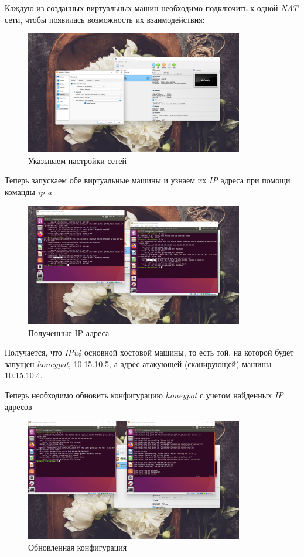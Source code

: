 \documentclass[a4paper]{article}
\begin{document}
  Каждую из созданных виртуальных машин необходимо подключить к одной \textit{NAT}
  сети, чтобы появилась возможность их взаимодействия:

  \begin{figure}[H]
    \centering
    \includegraphics[width=0.85\textwidth]{01_00 (20)}
    \caption{Указываем настройки сетей}
  \end{figure}

  Теперь запускаем обе виртуальные машины и узнаем их \textit{IP} адреса
  при помощи команды \textit{ip a}

  \begin{figure}[H]
    \centering
    \includegraphics[width=0.85\textwidth]{01_00 (7)}
    \caption{Полученные IP адреса}
  \end{figure}

  Получается, что \textit{IPv4} основной хостовой машины, то есть той, на которой будет запущен \textit{honeypot},
  10.15.10.5, а адрес атакующей (сканирующей) машины - 10.15.10.4.

  Теперь необходимо обновить конфигурацию \textit{honeypot} с учетом найденных
  \textit{IP} адресов

  \begin{figure}[H]
    \centering
    \includegraphics[width=0.85\textwidth]{01_00 (22)}
    \caption{Обновленная конфигурация}
  \end{figure}
\end{document}
